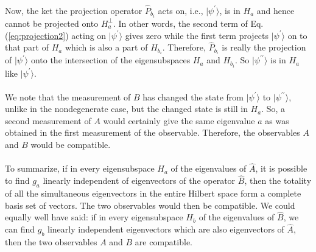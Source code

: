 \paragraph{}
Now, the  ket the projection operator $\hat{P}_{b_i}$ acts on, i.e., $|\psi^{\prime}\rangle$, is in $H_a$ and hence cannot be projected onto $H_a^{\bot}$. In other words, the second term of Eq. (\ref{eq:projection2}) acting on $|\psi^{\prime}\rangle$
gives zero while the first term projects $|\psi^{\prime}\rangle$ on to that part of $H_a$ which is also a part of $H_{b_i}$.
Therefore, $\hat{P}_{b_i}$ is really the projection of $|\psi^{\prime}\rangle$ onto the intersection of the eigensubspaces 
$H_a$ and $H_{b_i}$. So $|\psi^{\prime \prime}\rangle$ is in $H_a$ like $|\psi^{\prime}\rangle$.


\paragraph{}
 We note that the measurement of $B$ has changed the state from $|\psi^{\prime}\rangle$ to $|\psi^{\prime\prime}\rangle$, unlike in the nondegenerate case, but the changed state is still in $H_a$. So, a second measurement of $A$ would certainly
 give the same eigenvalue $a$ as was obtained in the first measurement of the observable. 
Therefore, the observables  $A$ and $B$ would be compatible.


\paragraph{}
To summarize, if in every  eigensubspace $H_a$ of the eigenvalues of $\hat{A}$, it is possible to find $g_a$ linearly independent of eigenvectors of the operator $\hat{B}$, then the totality of all the simultaneous eigenvectors in the entire Hilbert space form a complete basis set of vectors. The two observables would then be compatible. We could equally well have said: if in every eigensubspace $H_b$ of the eigenvalues of $\hat{B}$, we can find $g_b$ linearly independent eigenvectors which are also eigenvectors of $\hat{A}$, then the two observables $A$ and $B$ are compatible.


